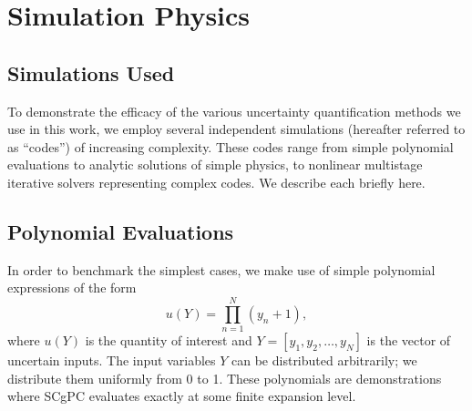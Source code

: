 
\chapter{Simulation Physics} %

\label{ch:models} %



\section{Simulations Used}
To demonstrate the efficacy of the various uncertainty quantification methods we use in this work, we employ
several independent simulations (hereafter referred to as ``codes'') of increasing complexity.  These codes
range from simple polynomial evaluations to analytic solutions of simple physics, to nonlinear multistage
iterative solvers representing complex codes.  We describe each briefly here.

\section{Polynomial Evaluations}
In order to benchmark the simplest cases, we make use of simple polynomial expressions of the form
\begin{equation}
  u(Y) = \prod_{n=1}^N (y_n+1),
\end{equation}
where $u(Y)$ is the quantity of interest and $Y=[y_1,y_2,\ldots,y_N]$ is the vector of uncertain inputs.
The input variables $Y$ can be distributed arbitrarily; we distribute them uniformly from 0 to 1.
These polynomials are demonstrations where SCgPC evaluates exactly at some
finite expansion level.




